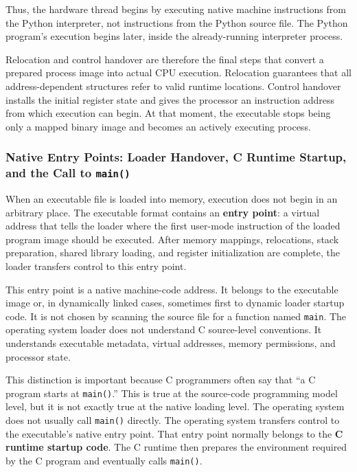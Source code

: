 Thus, the hardware thread begins by executing native machine instructions from the Python interpreter, not instructions from the Python source file. The Python program's execution begins later, inside the already-running interpreter process.

Relocation and control handover are therefore the final steps that convert a prepared process image into actual CPU execution. Relocation guarantees that all address-dependent structures refer to valid runtime locations. Control handover installs the initial register state and gives the processor an instruction address from which execution can begin. At that moment, the executable stops being only a mapped binary image and becomes an actively executing process.


\subsubsection{Native Entry Points: Loader Handover, C Runtime Startup, and the Call to \texttt{main()}}

When an executable file is loaded into memory, execution does not begin in an arbitrary place. The executable format contains an \textbf{entry point}: a virtual address that tells the loader where the first user-mode instruction of the loaded program image should be executed. After memory mappings, relocations, stack preparation, shared library loading, and register initialization are complete, the loader transfers control to this entry point.

This entry point is a native machine-code address. It belongs to the executable image or, in dynamically linked cases, sometimes first to dynamic loader startup code. It is not chosen by scanning the source file for a function named \texttt{main}. The operating system loader does not understand C source-level conventions. It understands executable metadata, virtual addresses, memory permissions, and processor state.

This distinction is important because C programmers often say that ``a C program starts at \texttt{main()}.'' This is true at the source-code programming model level, but it is not exactly true at the native loading level. The operating system does not usually call \texttt{main()} directly. The operating system transfers control to the executable's native entry point. That entry point normally belongs to the \textbf{C runtime startup code}. The C runtime then prepares the environment required by the C program and eventually calls \texttt{main()}.

